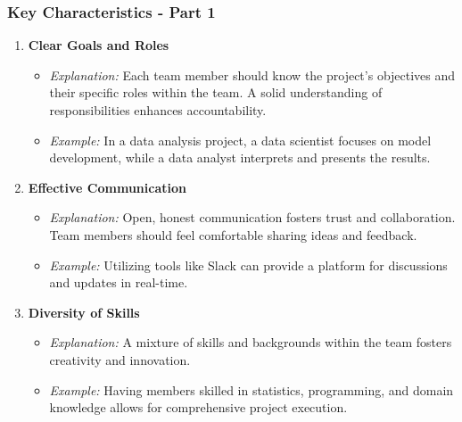 \documentclass[aspectratio=169]{beamer}
\begin{document}
\begin{frame}[fragile]
    \frametitle{Key Characteristics - Part 1}
    \begin{enumerate}
        \item \textbf{Clear Goals and Roles}
        \begin{itemize}
            \item \textit{Explanation:} Each team member should know the project's objectives and their specific roles within the team. A solid understanding of responsibilities enhances accountability.
            \item \textit{Example:} In a data analysis project, a data scientist focuses on model development, while a data analyst interprets and presents the results.
        \end{itemize}
        
        \item \textbf{Effective Communication}
        \begin{itemize}
            \item \textit{Explanation:} Open, honest communication fosters trust and collaboration. Team members should feel comfortable sharing ideas and feedback.
            \item \textit{Example:} Utilizing tools like Slack can provide a platform for discussions and updates in real-time.
        \end{itemize}
        
        \item \textbf{Diversity of Skills}
        \begin{itemize}
            \item \textit{Explanation:} A mixture of skills and backgrounds within the team fosters creativity and innovation.
            \item \textit{Example:} Having members skilled in statistics, programming, and domain knowledge allows for comprehensive project execution.
        \end{itemize}
    \end{enumerate}
\end{frame}
\end{document}
